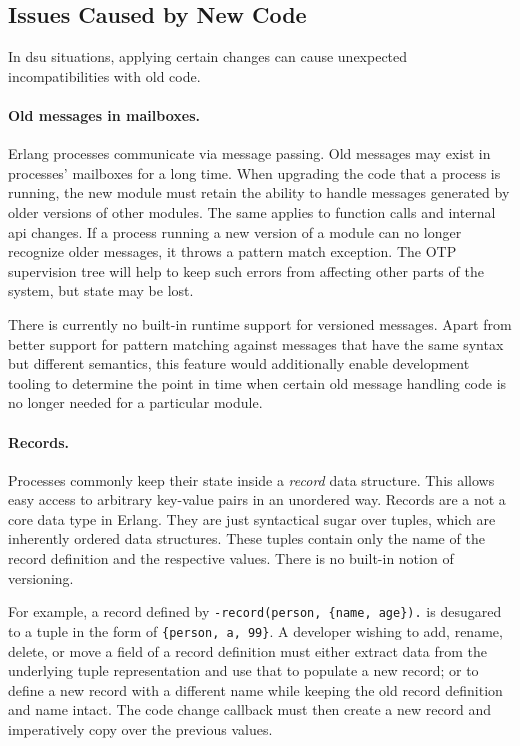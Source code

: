 \cleardoublepage
\subsection{Issues Caused by New Code}

In \acrshort{dsu} situations, applying certain changes can cause unexpected incompatibilities with old code.

\paragraph{Old messages in mailboxes.} Erlang processes communicate via message passing. Old messages may exist in processes' mailboxes for a long time. When upgrading the code that a process is running, the new module must retain the ability to handle messages generated by older versions of other modules. The same applies to function calls and internal \acrshort{api} changes. If a process running a new version of a module can no longer recognize older messages, it throws a pattern match exception. The OTP supervision tree will help to keep such errors from affecting other parts of the system, but state may be lost.

There is currently no built-in runtime support for versioned messages. Apart from better support for pattern matching against messages that have the same syntax but different semantics, this feature would additionally enable development tooling to determine the point in time when certain old message handling code is no longer needed for a particular module.

\paragraph{Records.}
Processes commonly keep their state inside a \emph{record} data structure. This allows easy access to arbitrary key-value pairs in an unordered way. Records are a not a core data type in Erlang. They are just syntactical sugar over tuples, which are inherently ordered data structures. These tuples contain only the name of the record definition and the respective values. There is no built-in notion of versioning.

For example, a record defined by \lstinline|-record(person, {name, age}).| is desugared to a tuple in the form of \lstinline|{person, a, 99}|. A developer wishing to add, rename, delete, or move a field of a record definition must either extract data from the underlying tuple representation and use that to populate a new record; or to define a new record with a different name while keeping the old record definition and name intact. The code change callback must then create a new record and imperatively copy over the previous values.

